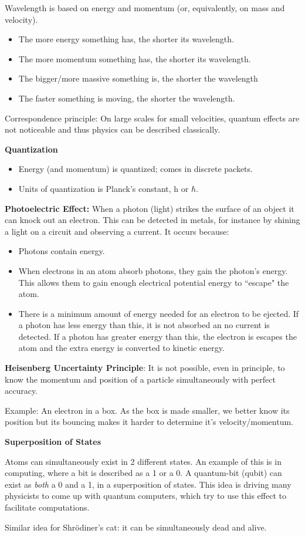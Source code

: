 \documentclass[12pt]{article}
\begin{document}
Wavelength is based on energy and momentum (or, equivalently, on mass and velocity).
\begin{itemize}
	\item The more energy something has, the shorter its wavelength.
	\item The more momentum something has, the shorter its wavelength.
	\item The bigger/more massive something is, the shorter the wavelength
	\item The faster something is moving, the shorter the wavelength.
\end{itemize}

Correspondence principle: On large scales for small velocities, quantum effects are not noticeable and thus physics can be described classically.

\textbf{Quantization}

\begin{itemize}
	\item Energy (and momentum) is quantized; comes in discrete packets.
	\item Units of quantization is Planck's constant, h or $\hbar$.
\end{itemize}

\textbf{Photoelectric Effect:} When a photon (light) strikes the surface of an object it can knock out an electron. This can be detected in metals, for instance by shining a light on a circuit and observing a current. It occurs because:
\begin{itemize}
	\item Photons contain energy.
	\item When electrons in an atom absorb photons, they gain the photon's energy. This allows them to gain enough electrical potential energy to ``escape" the atom.
	\item There is a minimum amount of energy needed for an electron to be ejected. If a photon has less energy than this, it is not absorbed an no current is detected. If a photon has greater energy than this, the electron is escapes the atom and the extra energy is converted to kinetic energy.
\end{itemize}

\textbf{Heisenberg Uncertainty Principle}: It is not possible, even in principle, to know the momentum and position of a particle simultaneously with perfect accuracy.

Example: An electron in a box. As the box is made smaller, we better know its position but its bouncing makes it harder to determine it's velocity/momentum.

\textbf{Superposition of States}

Atoms can simultaneously exist in 2 different states. An example of this is in computing, where a bit is described as a 1 or a 0. A quantum-bit (qubit) can exist as \textit{both} a 0 and a 1, in a superposition of states. This idea is driving many physicists to come up with quantum computers, which try to use this effect to facilitate computations.

Similar idea for Shr{\"o}diner's cat: it can be simultaneously dead and alive.
\end{document}
